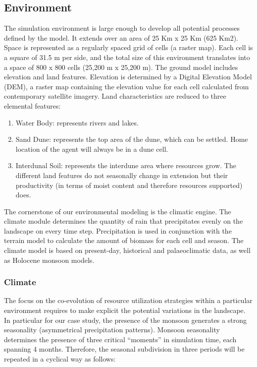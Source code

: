 \subsection{Environment}
The simulation environment is large enough to develop all potential processes defined by the model. It
extends over an area of 25 Km x 25 Km (625 Km2). Space is represented as a regularly spaced grid
of cells (a raster map). Each cell is a square of 31.5 m per side, and the total size of this environment
translates into a space of 800 x 800 cells (25,200 m x 25,200 m).
The ground model includes elevation and land features. Elevation is determined by a Digital Elevation
Model (DEM), a raster map containing the elevation value for each cell calculated from contemporary
satellite imagery. Land characteristics are reduced to three elemental features:

\begin{enumerate}
\item Water Body: represents rivers and lakes.
\item Sand Dune: represents the top area of the dune, which can be settled. Home location of the
agent will always be in a dune cell.
\item Interdunal Soil: represents the interdune area where resources grow. The different land
features do not seasonally change in extension but their productivity (in terms of moist content
and therefore resources supported) does.
\end{enumerate}

The cornerstone of our environmental modeling is the climatic engine. The climate module determines
the quantity of rain that precipitates evenly on the landscape on every time step. Precipitation is used
in conjunction with the terrain model to calculate the amount of biomass for each cell and season. The
climate model is based on present-day, historical and palaeoclimatic data, as well as Holocene
monsoon models.

\subsubsection{Climate}
The focus on the co-evolution of resource utilization strategies within a particular environment requires
to make explicit the potential variations in the landscape. In particular for our case study, the presence
of the monsoon generates a strong seasonality (asymmetrical precipitation patterns).
Monsoon seasonality determines the presence of three critical “moments” in simulation time, each
spanning 4 months. Therefore, the seasonal subdivision in three periods will be repeated in a cyclical
way as follows:

